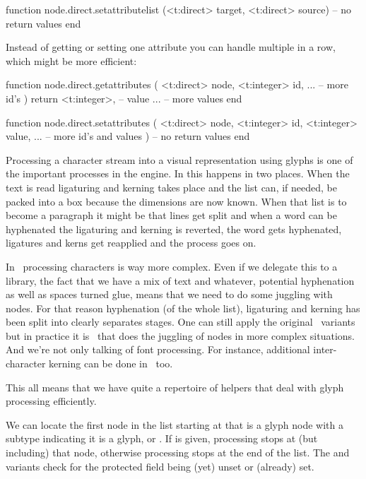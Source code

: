 function node.direct.setattributelist (<t:direct> target, <t:direct> source)
    -- no return values
end
\stoptyping

Instead of getting or setting one attribute you can handle multiple in a row,
which might be more efficient:

\starttyping[option=LUA]
function node.direct.getattributes (
    <t:direct>  node,
    <t:integer> id,
    ...              -- more id's
)
    return
        <t:integer>, -- value
        ...          -- more values
end

function node.direct.setattributes (
    <t:direct>  node,
    <t:integer> id,
    <t:integer> value,
    ...                -- more id's and values
)
    -- no return values
end
\stoptyping

\stopsubsection

\startsubsection[title={Glyph handling}]

Processing a character stream into a visual representation using glyphs is one of
the important processes in the engine. In  this happens in two places. When
the text is read ligaturing and kerning takes place and the list can, if needed,
be packed into a box because the dimensions are now known. When that list is to
become a paragraph it might be that lines get split and when a word can be
hyphenated the ligaturing and kerning is reverted, the word gets hyphenated,
ligatures and kerns get reapplied and the process goes on.

In \OPENTYPE\ processing characters is way more complex. Even if we delegate this
to a library, the fact that we have a mix of text and whatever, potential
hyphenation as well as spaces turned glue, means that we need to do some juggling
with nodes. For that reason hyphenation (of the whole list), ligaturing and
kerning has been split into clearly separates stages. One can still apply the
original \TEX\ variants but in practice it is \LUA\ that does the juggling of
nodes in more complex situations. And we're not only talking of font processing.
For instance, additional inter-character kerning can be done in \LUA\ too.

This all means that we have quite a repertoire of helpers that deal with glyph
processing efficiently.

We can locate the first node in the list starting at  that is a glyph node
with a subtype indicating it is a glyph, or . If  is given,
processing stops at (but including) that node, otherwise processing stops at the
end of the list. The  and  variants check for the
protected field being (yet) unset or (already) set.

